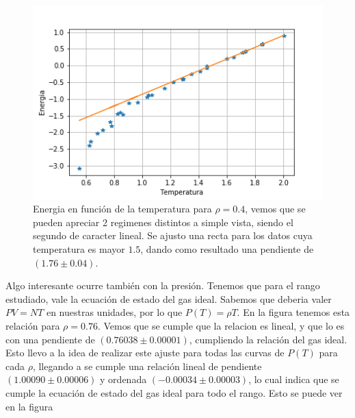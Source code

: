 \documentclass[%
 reprint,
 amsmath,amssymb,
 aps,
]{revtex4-1}
\begin{document}
\begin{figure}
  \begin{center}
  \includegraphics[scale=0.62]{images/e_vs_t_rho_0_4.png}
  \caption{Energia en funci\'on de la temperatura para $\rho = 0.4$, vemos que
  se pueden apreciar 2 regimenes distintos a simple vista, siendo el segundo de
  caracter lineal. Se ajusto una recta para los datos cuya temperatura es
  mayor $1.5$, dando como resultado una pendiente de $(1.76 \pm 0.04)$.}
  \label{e_vs_t_rho_0_4}
\end{center}
\end{figure}

Algo interesante ocurre tambi\'en con la presi\'on. Tenemos que para el rango
estudiado, vale la ecuaci\'on de estado del gas ideal. Sabemos que deberia
valer $PV = NT$ en nuestras unidades, por lo que $P(T) = \rho T$. En la figura
\label{presion_vs_t} tenemos esta relaci\'on para $\rho = 0.76$. Vemos que se
cumple que la relacion es lineal, y que lo es con una pendiente de
$(0.76038 \pm 0.00001)$, cumpliendo la relaci\'on del gas ideal. Esto llevo a la
idea de realizar este ajuste para todas las curvas de $P(T)$ para cada $\rho$,
llegando a se cumple una relaci\'on lineal de pendiente $(1.00090 \pm 0.00006)$
y ordenada $(-0.00034 \pm 0.00003)$, lo cual indica que se cumple la ecuaci\'on
de estado del gas ideal para todo el rango. Esto se puede ver en la figura
\label{pendientes_vs_rhos}
\end{document}
